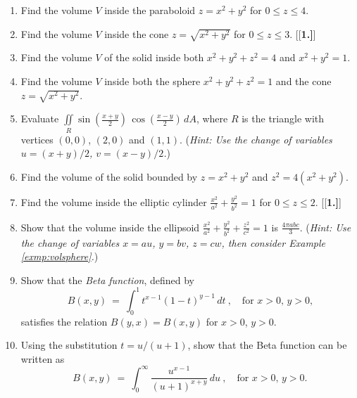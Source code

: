 \begin{enumerate}[\bfseries 1.]
 \item Find the volume $V$ inside the paraboloid $z=x^2 + y^2$ for $0 \le z \le 4$.
 \item Find the volume $V$ inside the cone $z=\sqrt{x^2 + y^2}$ for $0 \le z \le 3$.
[{[\bfseries 1.]}]
 \item Find the volume $V$ of the solid inside both $x^2 + y^2 + z^2 = 4$ and $x^2 + y^2 = 1$.
 \item Find the volume $V$ inside both the sphere $x^2 + y^2 + z^2 = 1$ and the cone $z=\sqrt{x^2 + y^2}$.
 \item Evaluate $\iint\limits_{R} \sin \left( \frac{x+y}{2} \right)\,\cos \left( \frac{x-y}{2} \right)\,dA$, where $R$
  is the triangle with vertices $(0,0)$, $(2,0)$ and $(1,1)$. (\emph{Hint: Use the change of variables
  $u=(x+y)/2$, $v=(x-y)/2$.})
 \item Find the volume of the solid bounded by $z=x^2 + y^2$ and $z^2 = 4(x^2 + y^2 )$.
 \item Find the volume inside the elliptic cylinder $\frac{x^2}{a^2} + \frac{y^2}{b^2} = 1$ for $0\le z\le 2$.
[{[\bfseries 1.]}]
 \item Show that the volume inside the ellipsoid $\frac{x^2}{a^2} + \frac{y^2}{b^2} + \frac{z^2}{c^2} = 1$ is
  $\tfrac{4\pi abc}{3}$. (\emph{Hint: Use the change of variables $x=au$, $y=bv$, $z=cw$, then consider Example
  \ref{exmp:volsphere}.})
 \item Show that the \emph{Beta function}, defined by
  \begin{displaymath}
   B(x,y) ~=~ \int_0^1 t^{x-1} (1-t)^{y-1} \,dt ~,\quad\text{for $x > 0$, $y > 0$,}
  \end{displaymath}
  satisfies the relation $B(y,x)=B(x,y)$ for $x > 0$, $y > 0$.
 \item Using the substitution $t=u/(u+1)$, show that the Beta function can be written as
  \begin{displaymath}
   B(x,y) ~=~ \int_0^{\infty} \frac{u^{x-1}}{(u+1)^{x+y}}\,du ~,\quad\text{for $x > 0$, $y > 0$.}
  \end{displaymath}
\end{enumerate}
\newpage
